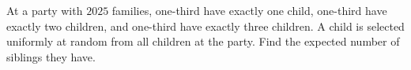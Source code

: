 At a party with $2025$ families, one-third have exactly one child, one-third have exactly two children, and one-third have exactly three children. A child is selected uniformly at random from all children at the party. Find the expected number of siblings they have.
